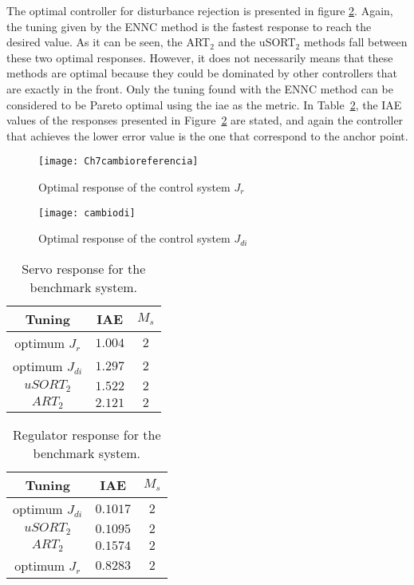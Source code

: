 The optimal controller for disturbance rejection is presented in figure \ref{fig:cambiodi}. Again, the tuning given by the ENNC method is the fastest response to reach the desired value. As it can be seen, the ART$_2$ and the uSORT$_{2}$ methods fall between these two optimal responses. However, it does not necessarily means that these methods are optimal because they could be dominated by other controllers that are exactly in the front. Only the tuning found with the ENNC method can be considered to be Pareto optimal using the \gls{iae} as the metric. In Table~\ref{tab:IAEdi}, the IAE values of the responses presented in Figure~\ref{fig:cambiodi} are stated, and again the controller that achieves the lower error value is the one that correspond to the anchor point.
\begin{figure}[tb]%
	\centering
	\texttt{[image: Ch7cambioreferencia]}%
	\caption{Optimal response of the control system $J_r$}%
	\label{fig:Ch7cambioreferencia}%
\end{figure}
%
\begin{figure}[tb]%
	\centering
	\texttt{[image: cambiodi]}%
	\caption{Optimal response of the control system $J_{di}$}%
	\label{fig:cambiodi}%
\end{figure}
%
\begin{table}[tb]
	\caption{Servo response for the benchmark system.}
	\centering
	\begin{tabular}{@{}*{3}{c}@{}}
		\toprule
		Tuning             &IAE        &$M_s$   \\
		\midrule              
		optimum $J_{r}$     &$1.004$   & $2$    \\
		optimum $J_{di}$    &$1.297$   & $2$    \\
		$uSORT_2$          &$1.522$   & $2$    \\
		$ART_2$          &$2.121$   & $2$    \\	
		\bottomrule				
	\end{tabular}
	\label{tab:IAEref}
\end{table}
%
\begin{table}[tb]
	\caption{Regulator response for the benchmark system.}
	\centering
	\begin{tabular}{@{}*{3}{c}@{}}
		\toprule
		Tuning            &IAE        &$M_s$   \\
		\midrule              
		optimum $J_{di}$   &$0.1017$   & $2$    \\
		$uSORT_2$          &$0.1095$   & $2$    \\
		$ART_2$            &$0.1574$    & $2$    \\	
		optimum $J_{r}$    &$0.8283$   & $2$    \\
		\bottomrule				
	\end{tabular}
	\label{tab:IAEdi}
\end{table}

